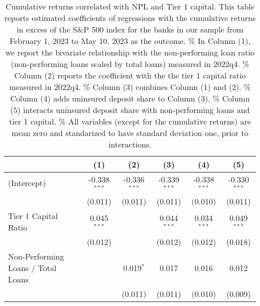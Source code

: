 
\begin{table}[htbp]
   \caption{\label{tab:npl_capital_late} Cumulative returns correlated with NPL and Tier 1 capital. This table reports estimated coefficients of regressions with the cumulative returns in excess of the S\&P 500 index for the banks in our sample from February 1, 2023 to May 10, 2023 as the outcome. \%
      In Column (1), we report the bivariate relationship with the non-performing loan ratio (non-performing loans scaled by total loans) measured in 2022q4. \%
      Column (2) reports the coefficient with the the tier 1 capital ratio measured in 2022q4. \%
      Column (3) combines Column (1) and (2). \%
       Column (4) adds uninsured deposit share to Column (3). \%
       Column (5) interacts uninsured deposit share with non-performing loans and tier 1 capital. \%
       All variables (except for the cumulative returns) are mean zero and standarized to have standard deviation one, prior to interactions.}
   \bigskip
   \centering
   \begin{adjustbox}{width = 1.2\textwidth, center}
      \begin{tabular}{lccccc}
         \toprule
                                                                              & (1)            & (2)            & (3)            & (4)            & (5)\\  
         \midrule 
         (Intercept)                                                          & -0.338$^{***}$ & -0.336$^{***}$ & -0.339$^{***}$ & -0.338$^{***}$ & -0.330$^{***}$\\   
                                                                              & (0.011)        & (0.011)        & (0.011)        & (0.010)        & (0.011)\\   
         Tier 1 Capital Ratio                                                 & 0.045$^{***}$  &                & 0.044$^{***}$  & 0.034$^{***}$  & 0.049$^{***}$\\   
                                                                              & (0.012)        &                & (0.012)        & (0.012)        & (0.018)\\   
         Non-Performing Loans / Total Loans                                   &                & 0.019$^{*}$    & 0.017          & 0.016          & 0.012\\   
                                                                              &                & (0.011)        & (0.011)        & (0.010)        & (0.009)\\   

\end{tabular}
\end{adjustbox}
\end{table}
